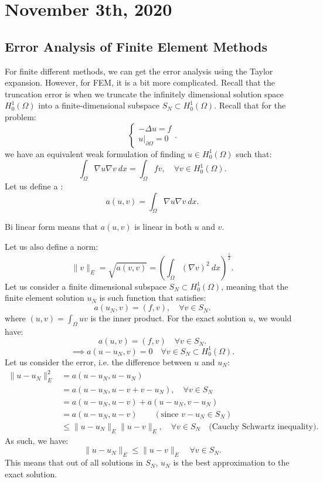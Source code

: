 \documentclass[../main/main.tex]{subfiles}
\begin{document}
\section{November  3th, 2020}
\subsection{Error Analysis of Finite Element Methods}
For finite different methods, we can get the error analysis using the Taylor expansion. However, for FEM, it is a bit more complicated. Recall that the truncation error is when we truncate the infinitely dimensional solution space $H^1_0(\Omega)$ into a finite-dimensional subspace  $S_N \subset H^1_0(\Omega)$. Recall that for the problem: \[
\begin{cases}
    -\Delta u = f \\
u\big\rvert_{\partial \Omega} = 0
\end{cases}
.\] we have an equivalent weak formulation of finding $u \in  H^1_0(\Omega)$ such that: \[
\int_\Omega \nabla u\nabla v~dx = \int_\Omega fv, \quad  \forall  v \in  H^1_0(\Omega)
.\] Let us define a : \[
a(u,v) = \int_\Omega \nabla u \nabla  v~dx
.\] 
\begin{remark}
    Bi linear form means that $a(u,v)$ is linear in both  $u$ and $v$.
\end{remark}
Let us also define a norm: \[
    \|v\|_E = \sqrt{a(v,v)} = \left( \int_\Omega (\nabla v)^2~dx \right)  ^\frac{1}{2}
.\] 
Let us consider a finite dimensional subspace $S_N\subset H^1_0(\Omega)$, meaning that the finite element solution $u_N$ is such function that satisfies:  \[
    a(u_N,v) = (f,v), \quad\forall  v \in S_N
    .\] where $(u,v) = \int_\Omega uv$ is the inner product. For the exact solution $u$, we would have: \[
a(u,v) = (f,v) \quad \forall v \in  S_N
.\] \[
\implies a(u-u_N,v) = 0 \quad\forall  v\in S_N\subset H^1_0(\Omega)
.\] Let us consider the error, i.e. the difference between $u$ and $u_N$:
\begin{align*} 
    \|u-u_N\|^2_E &= a(u-u_N,u-u_N) \\
                  &= a(u-u_N, u-v+v-u_N), \quad \forall  v \in  S_N\\
                  &= a(u-u_N,u-v) + a(u-u_N,v-u_N) \\
                  &= a(u-u_N,u-v) \quad\quad (\text{since $v-u_N\in S_N$})\\
                  &\le \|u-u_N\|_E \|u-v\|_E, \quad \forall  v \in  S_N \quad\text{(Cauchy Schwartz inequality)}
.\end{align*}
As such, we have: \[
    \|u-u_{N}\|_E \le  \|u-v\|_E \quad\forall v \in S_N
.\] This means that out of all solutions in $S_N$, $u_N$ is the best approximation to the exact solution. \\
\end{document}
